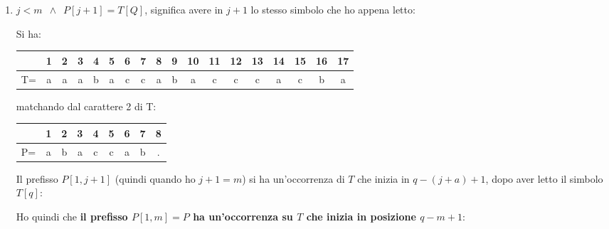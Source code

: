 \begin{enumerate}
  \item $j<m\,\,\,\land\,\,\,P[j+1]=T[Q]$, significa avere in $j+1$ lo stesso
  simbolo che ho appena letto:
  \begin{esempio}
    Si ha:
    \begin{table}[H]
      \centering
      \begin{tabular}{c||c|c|c|c|c|c|c|c|c|c|c|c|c|c|c|c|c}
        \hline
        & 1 & 2 & 3 & 4 & 5 & 6 & 7 & 8 & 9 & 10 & 11 & 12 & 13 &14&15&16&17\\
        \hline
        T=&a& a & a& b& a& c &c &a &b &a&c&c&c&a &c &b &a\\
        \hline
      \end{tabular}
    \end{table}
    matchando dal carattere 2 di T:
    \begin{table}[H]
      \centering
      \begin{tabular}{c||c|c|c|c|c|c|c|c}
        \hline
        & 1 & 2 & 3 & 4 & 5 & 6 & 7 &8\\
        \hline
        P=&a& b & a& c& c& a &b &. \\
        \hline
      \end{tabular}
    \end{table}

  \end{esempio}
  Il prefisso $P[1,j+1]$ (quindi quando ho $j+1=m$) si ha un'occorrenza di $T$
  che inizia in $q-(j+a)+1$, dopo aver letto il simbolo $T[q]$:
  \begin{center}
  \end{center}
  Ho quindi che \textbf{il prefisso $P[1,m]=P$ ha un'occorrenza su $T$ che
    inizia in posizione $q-m+1$}:
  \begin{center}
  \end{center}
  

\end{enumerate}
